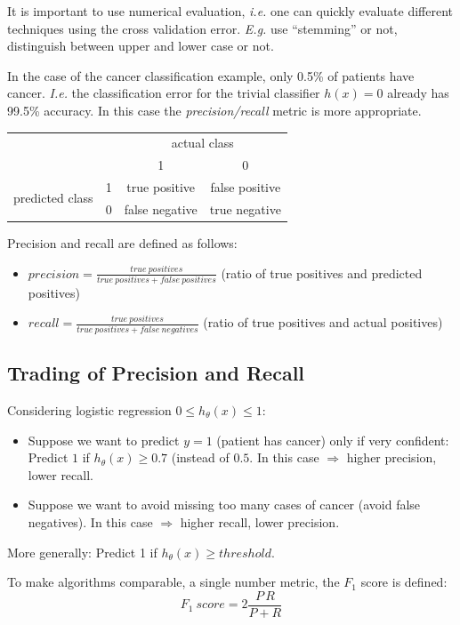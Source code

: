 \documentclass[a4paper,twoside,10pt]{article}
\begin{document}
It is important to use numerical evaluation, \emph{i.e.} one can quickly evaluate different techniques using the cross validation error. \emph{E.g.} use ``stemming'' or not, distinguish between upper and lower case or not.

In the case of the cancer classification example, only 0.5\% of patients have cancer.
\emph{I.e.} the classification error for the trivial classifier $h(x)=0$ already has 99.5\% accuracy.
In this case the \emph{precision/recall} metric is more appropriate.
\begin{center}
  \begin{tabular}{cc|cc}
    & & \multicolumn{2}{c}{actual class}\\
    &  & 1 & 0\\\hline
    \multirow{2}{*}{predicted class} & 1 & true positive & false positive\\
    & 0 & false negative & true negative\\
  \end{tabular}
\end{center}
Precision and recall are defined as follows:
\begin{itemize}
  \item $precision=\frac{true\ positives}{true\ positives+false\ positives}$ (ratio of true positives and predicted positives)
  \item $recall=\frac{true\ positives}{true\ positives+false\ negatives}$ (ratio of true positives and actual positives)
\end{itemize}

\subsection{Trading of Precision and Recall}
Considering logistic regression $0\le h_\theta(x)\le 1$:
\begin{itemize}
  \item Suppose we want to predict $y=1$ (patient has cancer) only if very confident:
    Predict $1$ if $h_\theta(x)\ge 0.7$ (instead of $0.5$.
    In this case $\Rightarrow$ higher precision, lower recall.
  \item Suppose we want to avoid missing too many cases of cancer (avoid false negatives).
    In this case $\Rightarrow$ higher recall, lower precision.
\end{itemize}
More generally: Predict 1 if $h_\theta(x)\ge threshold$.

To make algorithms comparable, a single number metric, the $F_1$ score is defined:
\begin{equation*}
  F_1\ score=2\frac{P\,R}{P+R}
\end{equation*}
\end{document}
